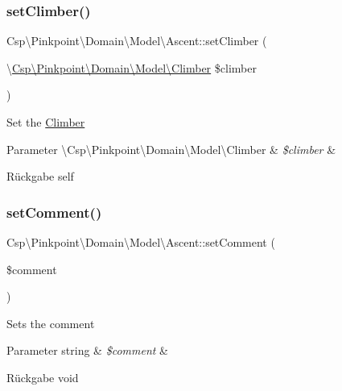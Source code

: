 \subsubsection{\texorpdfstring{set\+Climber()}{setClimber()}}
{\footnotesize\ttfamily Csp\textbackslash{}\+Pinkpoint\textbackslash{}\+Domain\textbackslash{}\+Model\textbackslash{}\+Ascent\+::set\+Climber (\begin{DoxyParamCaption}\item[{\textbackslash{}\hyperlink{classCsp_1_1Pinkpoint_1_1Domain_1_1Model_1_1Climber}{Csp\textbackslash{}\+Pinkpoint\textbackslash{}\+Domain\textbackslash{}\+Model\textbackslash{}\+Climber}}]{\$climber }\end{DoxyParamCaption})}

Set the \hyperlink{classCsp_1_1Pinkpoint_1_1Domain_1_1Model_1_1Climber}{Climber}


\begin{DoxyParams}[1]{Parameter}
\textbackslash{}\+Csp\textbackslash{}\+Pinkpoint\textbackslash{}\+Domain\textbackslash{}\+Model\textbackslash{}\+Climber & {\em \$climber} & \\
\hline
\end{DoxyParams}
\begin{DoxyReturn}{Rückgabe}
self 
\end{DoxyReturn}
\mbox{\label{classCsp_1_1Pinkpoint_1_1Domain_1_1Model_1_1Ascent_abf04371c42270fd67ae210329cebd533}} 
\subsubsection{\texorpdfstring{set\+Comment()}{setComment()}}
{\footnotesize\ttfamily Csp\textbackslash{}\+Pinkpoint\textbackslash{}\+Domain\textbackslash{}\+Model\textbackslash{}\+Ascent\+::set\+Comment (\begin{DoxyParamCaption}\item[{}]{\$comment }\end{DoxyParamCaption})}

Sets the comment


\begin{DoxyParams}[1]{Parameter}
string & {\em \$comment} & \\
\hline
\end{DoxyParams}
\begin{DoxyReturn}{Rückgabe}
void 
\end{DoxyReturn}
\mbox{\label{classCsp_1_1Pinkpoint_1_1Domain_1_1Model_1_1Ascent_a30311e5a0059c54c05526ca532e66be3}} 
